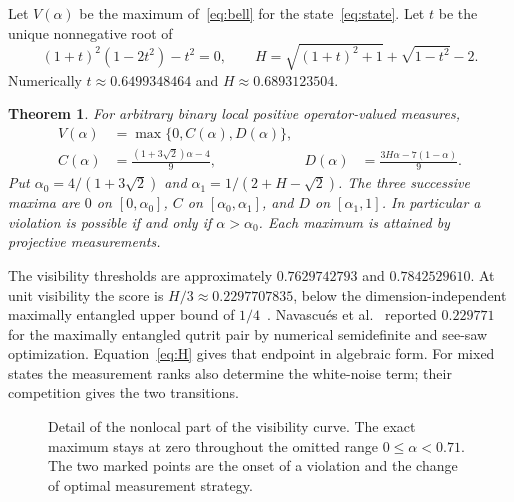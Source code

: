 \documentclass[11pt]{article}
\newtheorem{theorem}{Theorem}
\newcommand{\ra}{\alpha_{0}}
\newcommand{\rb}{\alpha_{1}}
\begin{document}
Let $V(\alpha)$ be the maximum of~\eqref{eq:bell} for the state~\eqref{eq:state}. Let $t$ be the unique nonnegative root of
\begin{equation}
 (1+t)^2(1-2t^2)-t^2=0,\qquad
 H=\sqrt{(1+t)^2+1}+\sqrt{1-t^2}-2.                       \label{eq:H}
\end{equation}
Numerically $t\approx0.6499348464$ and $H\approx0.6893123504$.
\begin{theorem}\label{th:main}
For arbitrary binary local positive operator-valued measures,
\begin{align}
 V(\alpha)&=\max\{0,C(\alpha),D(\alpha)\},                    \label{eq:envelope}\\
 C(\alpha)&=\frac{(1+3\sqrt2)\alpha-4}{9},
 &D(\alpha)&=\frac{3H\alpha-7(1-\alpha)}{9}.                \label{eq:lines}
\end{align}
Put $\ra=4/(1+3\sqrt2)$ and $\rb=1/(2+H-\sqrt2)$. The three successive maxima are $0$ on $[0,\ra]$, $C$ on $[\ra,\rb]$, and $D$ on $[\rb,1]$. In particular a violation is possible if and only if $\alpha>\ra$. Each maximum is attained by projective measurements.
\end{theorem}
The visibility thresholds are approximately $0.7629742793$ and $0.7842529610$. At unit visibility the score is $H/3\approx0.2297707835$, below the dimension-independent maximally entangled upper bound of $1/4$~\cite{vw}. Navascu\'es et al.~\cite{nav} reported $0.229771$ for the maximally entangled qutrit pair by numerical semidefinite and see-saw optimization. Equation~\eqref{eq:H} gives that endpoint in algebraic form. For mixed states the measurement ranks also determine the white-noise term; their competition gives the two transitions.

\begin{figure}[t]
\centering
{}
\caption{Detail of the nonlocal part of the visibility curve. The exact maximum stays at zero throughout the omitted range $0\le\alpha<0.71$. The two marked points are the onset of a violation and the change of optimal measurement strategy.}\label{fig:curve}
\end{figure}
\end{document}

